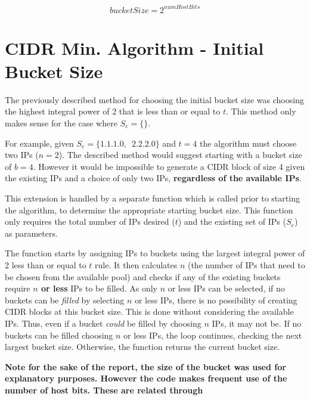 \begin{appendices}
\begin{equation}\label{eq:bucketSizeHostBits}
bucketSize = 2^{numHostBits}
\end{equation}
\vfill




\chapter{CIDR Min. Algorithm - Initial Bucket Size}
\label{appendix:smartInitBucket}
The previously described method for choosing the initial bucket size was choosing the highest integral power of 2 that is less than or equal to $t$. This method only makes sense for the case where $S_e = \{\}$. 

For example, given $S_e = \{1.1.1.0,\enspace2.2.2.0\}$ and $t = 4$ the algorithm must choose two IPs ($n = 2$). The described method would suggest starting with a bucket size of $b=4$. However it would be impossible to generate a CIDR block of size 4 given the existing IPs and a choice of only two IPs, \textbf{regardless of the available IPs}. 

This extension is handled by a separate function which is called prior to starting the algorithm, to determine the appropriate starting bucket size. This function only requires the total number of IPs desired ($t$) and the existing set of IPs ($S_e$) as parameters. 

The function starts by assigning IPs to buckets using the largest integral power of 2 less than or equal to $t$ rule. It then calculates $n$ (the number of IPs that need to be chosen from the available pool) and checks if any of the existing buckets require \textbf{$n$ or less} IPs to be filled. As only $n$ or less IPs can be selected, if no buckets can be \textit{filled} by selecting $n$ or less IPs, there is no possibility of creating CIDR blocks at this bucket size. This is done without considering the available IPs. Thus, even if a bucket \textit{could} be filled by choosing $n$ IPs, it may not be. If no buckets can be filled choosing $n$ or less IPs, the loop continues, checking the next largest bucket size. Otherwise, the function returns the current bucket size.

\textbf{Note for the sake of the report, the size of the bucket was used for explanatory purposes. However the code makes frequent use of the number of host bits. These are related through }


\end{appendices}
